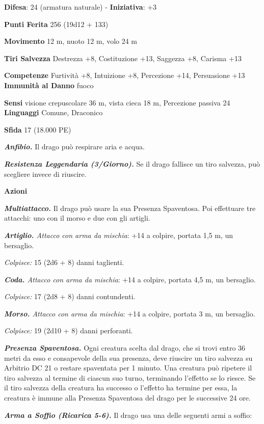 \begin{multicols}{2}
\textbf{Difesa}: 24 (armatura naturale) - \textbf{Iniziativa}: +3

\textbf{Punti Ferita} 256 (19d12 + 133)

\textbf{Movimento} 12 m, nuoto 12 m, volo 24 m

\textbf{Tiri Salvezza} Destrezza +8, Costituzione +13, Saggezza +8,
Carisma +13

\textbf{Competenze} Furtività +8, Intuizione +8, Percezione +14,
Persuasione +13 \textbf{Immunità al Danno} fuoco

\textbf{Sensi} visione crepuscolare 36 m, vista cieca 18 m, Percezione passiva
24 \textbf{Linguaggi} Comune, Draconico

\textbf{Sfida} 17 (18.000 PE)

\emph{\textbf{Anfibio.}} Il drago può respirare aria e acqua.

\emph{\textbf{Resistenza Leggendaria (3/Giorno).}} Se il drago fallisce
un tiro salvezza, può scegliere invece di riuscire.

\textbf{Azioni}

\emph{\textbf{Multiattacco.}} Il drago può usare la sua Presenza
Spaventosa. Poi effettuare tre attacchi: uno con il morso e due con gli
artigli.

\emph{\textbf{Artiglio.} Attacco con arma da mischia}: +14 a colpire,
portata 1,5 m, un bersaglio.

\emph{Colpisce:} 15 (2d6 + 8) danni taglienti.

\emph{\textbf{Coda.} Attacco con arma da mischia}: +14 a colpire,
portata 4,5 m, un bersaglio.

\emph{Colpisce:} 17 (2d8 + 8) danni contundenti.

\emph{\textbf{Morso.} Attacco con arma da mischia}: +14 a colpire,
portata 3 m, un bersaglio.

\emph{Colpisce:} 19 (2d10 + 8) danni perforanti.

\emph{\textbf{Presenza Spaventosa.}} Ogni creatura scelta dal drago, che
si trovi entro 36 metri da esso e consapevole della sua presenza, deve
riuscire un tiro salvezza su Arbitrio DC 21 o restare spaventata per 1
minuto. Una creatura può ripetere il tiro salvezza al termine di ciascun
suo turno, terminando l'effetto se lo riesce. Se il tiro salvezza della
creatura ha successo o l'effetto ha termine per essa, la creatura è
immune alla Presenza Spaventosa del drago per le successive 24 ore.

\emph{\textbf{Arma a Soffio (Ricarica 5-6).}} Il drago usa una delle
seguenti armi a soffio:


\end{multicols}
